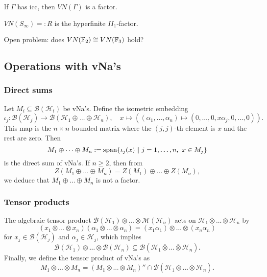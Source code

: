 \begin{theorem}
  If $\Gamma$ has icc, then $VN(\Gamma)$ is a factor.
\end{theorem}

\begin{definition}
  $VN(S_\infty) =: R$ is the hyperfinite $II_1$-factor.
\end{definition}

Open problem: does $VN (\mathbb {F}_2) \cong VN (\mathbb {F}_3)$ hold?

\subsection{Operations with vNa's}

\subsubsection*{Direct sums}

Let $M_i \subseteq \mathcal{B}(\mathcal{H}_i)$ be vNa's.
Define the isometric embedding 
$$\iota_j : \mathcal{B}(\mathcal{H}_j) \to \mathcal{B}(\mathcal{H}_1 \oplus \dots \oplus \mathcal{H}_n),\quad x \mapsto ((\alpha_1, \dots, \alpha_n) \mapsto (0, \dots, 0, x\alpha_j, 0, \dots, 0)).$$
This map is the $n \times n$ bounded matrix where the $(j, j)$-th element is $x$ and the rest are zero.
Then 
$$M_1 \oplus \dots \oplus M_n := \operatorname{span} \{\iota_j (x)\ |\ j = 1, \dots, n,\ x \in M_j\}$$
is the direct sum of vNa's. If $n \geq 2$, then from 
$$Z(M_1 \oplus \dots \oplus M_n) = Z(M_1) \oplus \dots \oplus Z(M_n),$$
we deduce that $M_1 \oplus \dots \oplus M_n$ is not a factor.

\subsubsection*{Tensor products}

The algebraic tensor product $\mathcal{B}(\mathcal{H}_1) \otimes \dots \otimes \mathcal{M} (\mathcal{H}_n)$
acts on $\mathcal{H}_1 \overline{\otimes} \dots \overline{\otimes} \mathcal{H}_n$ by
$$(x_1 \otimes \dots \otimes x_n) (\alpha_1 \otimes \dots \otimes \alpha_n) = (x_1 \alpha_1) \otimes \dots \otimes (x_n \alpha_n)$$
for $x_j \in \mathcal{B} (\mathcal{H}_j)$ and $\alpha_j \in \mathcal{H}_j$, which implies 
$$\mathcal{B}(\mathcal{H}_1) {\otimes} \dots {\otimes} \mathcal{B}(\mathcal{H}_n) \subseteq \mathcal{B}(\mathcal{H}_1 \overline{\otimes} \dots \overline{\otimes} \mathcal{H}_n).$$
Finally, we define the tensor product of vNa's as 
$$M_1 \overline{\otimes} \dots \overline{\otimes} M_n = (M_1 {\otimes} \dots {\otimes} M_n)'' \cap \mathcal{B}(\mathcal{H}_1 \overline{\otimes} \dots \overline{\otimes} \mathcal{H}_n).$$
 
